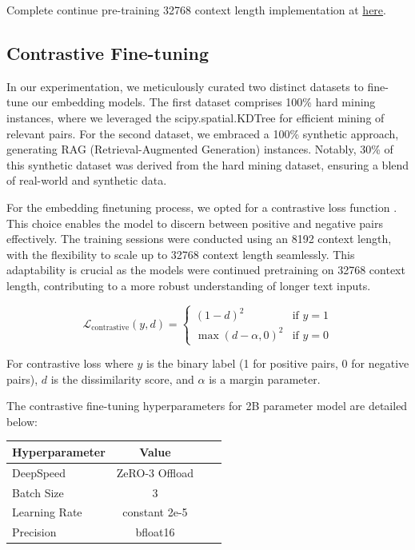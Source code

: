 \documentclass[preprint]{article}
\begin{document}
Complete continue pre-training 32768 context length implementation at \href{https://github.com/mesolitica/malaya/tree/5.1/session/llama2#600m-32768-context-length-flash-attention-2}{here}.

\subsection{Contrastive Fine-tuning}

In our experimentation, we meticulously curated two distinct datasets to fine-tune our embedding models. The first dataset comprises 100\% hard mining instances, where we leveraged the scipy.spatial.KDTree for efficient mining of relevant pairs. For the second dataset, we embraced a 100\% synthetic approach, generating RAG (Retrieval-Augmented Generation) instances. Notably, 30\% of this synthetic dataset was derived from the hard mining dataset, ensuring a blend of real-world and synthetic data.

For the embedding finetuning process, we opted for a contrastive loss function \cite{1467314}. This choice enables the model to discern between positive and negative pairs effectively. The training sessions were conducted using an 8192 context length, with the flexibility to scale up to 32768 context length seamlessly. This adaptability is crucial as the models were continued pretraining on 32768 context length, contributing to a more robust understanding of longer text inputs.

\begin{equation}
  \mathcal{L}_{\text{contrastive}}(y, d) = \begin{cases}
    (1 - d)^2             & \text{if } y = 1 \\
    \max(d - \alpha, 0)^2 & \text{if } y = 0
  \end{cases}
\end{equation}

For contrastive loss where $y$ is the binary label (1 for positive pairs, 0 for negative pairs), $d$ is the dissimilarity score, and $\alpha$ is a margin parameter.

\pagebreak

The contrastive fine-tuning hyperparameters for 2B parameter model are detailed below:

\begin{table}[h]
  \centering
  \begin{tabular}{lccl}
    \hline
    \textbf{Hyperparameter} & \textbf{Value} \\
    \hline
    DeepSpeed               & ZeRO-3 Offload \\
    Batch Size              & 3              \\
    Learning Rate           & constant 2e-5  \\
    Precision               & bfloat16       \\
    \hline
  \end{tabular}
\end{table}
\end{document}
